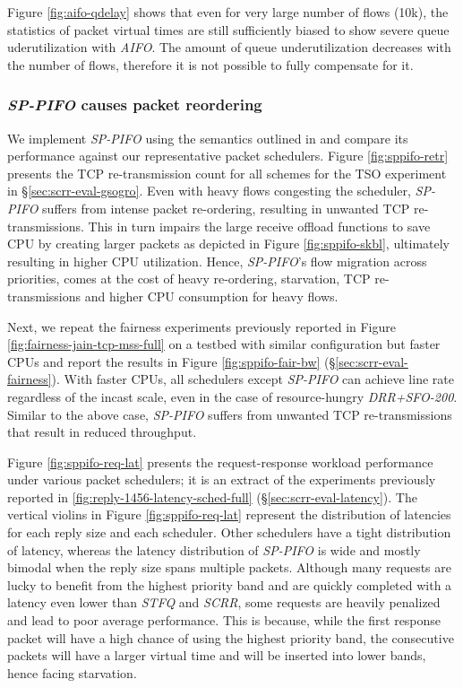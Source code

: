 Figure \ref{fig:aifo-qdelay} shows that even for very large number of
flows (10k), the statistics of packet virtual times are still
sufficiently biased to show severe queue uderutilization with
\textit{AIFO}. The amount of queue underutilization decreases with the number
of flows, therefore it is not possible to fully compensate for it. 

\subsubsection{\textit{SP-PIFO} causes packet reordering}
\label{app:sppifo-reorder}




We implement \textit{SP-PIFO} using the semantics outlined in \cite{sppifo} and compare its performance against our representative packet schedulers. Figure \ref{fig:sppifo-retr} presents the TCP re-transmission count for all schemes for the TSO experiment in \S\ref{sec:scrr-eval-gsogro}. Even with heavy flows congesting the scheduler, \textit{SP-PIFO} suffers from intense packet re-ordering, resulting in unwanted TCP re-transmissions. This in turn impairs the large receive offload functions to save CPU by creating larger packets as depicted in Figure \ref{fig:sppifo-skbl}, ultimately resulting in higher CPU utilization. Hence, \textit{SP-PIFO}'s flow migration across priorities, comes at the cost of heavy re-ordering, starvation, TCP re-transmissions and higher CPU consumption for heavy flows.

Next, we repeat the fairness experiments previously reported in Figure \ref{fig:fairness-jain-tcp-mss-full} on a testbed with similar configuration but faster CPUs and report the results in Figure \ref{fig:sppifo-fair-bw} (\S\ref{sec:scrr-eval-fairness}). With faster CPUs, all schedulers except \textit{SP-PIFO} can achieve line rate regardless of the incast scale, even in the case of resource-hungry \textit{DRR+SFO-200}. Similar to the above case, \textit{SP-PIFO} suffers from unwanted TCP re-transmissions that result in reduced throughput. 

Figure \ref{fig:sppifo-req-lat} presents the request-response workload
performance under various packet schedulers; it is an extract of the
experiments previously reported in \ref{fig:reply-1456-latency-sched-full}
(\S\ref{sec:scrr-eval-latency}). The vertical violins in
Figure \ref{fig:sppifo-req-lat} represent the distribution of latencies
for each reply size and each scheduler. Other schedulers have a tight
distribution of latency, whereas the latency distribution of \textit{SP-PIFO}
is wide and mostly bimodal when the reply size spans multiple
packets. Although many requests are lucky to benefit from the highest
priority band and are quickly completed with a latency even lower than \textit{STFQ} and \textit{SCRR},
some requests are heavily penalized and lead to poor average
performance. This is because, while the first response packet will
have a high chance of using the highest priority band, the consecutive
packets will have a larger virtual time and will be inserted into
lower bands, hence facing starvation.


